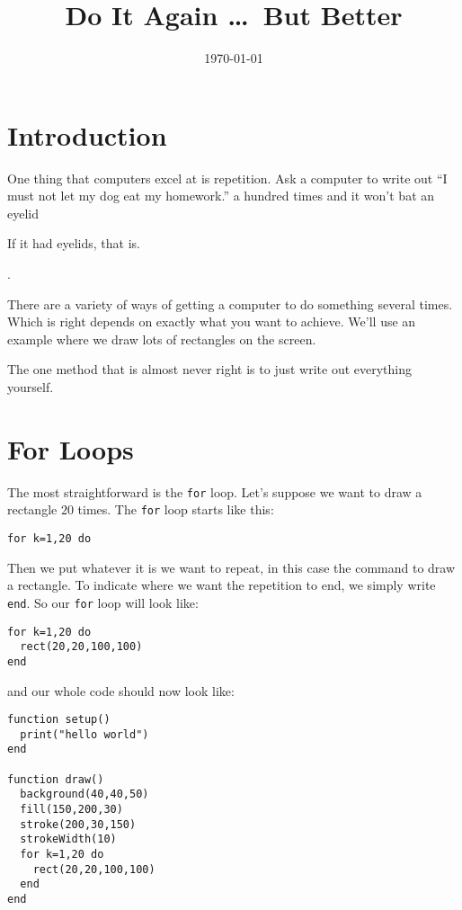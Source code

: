 \documentclass[
  xhtml,%
  use filename%
]{internet}
\title{Do It Again \dots\ But Better}
\date{\today}
\begin{document}
\maketitle

\section{Introduction}

One thing that computers excel at is repetition.
Ask a computer to write out ``I must not let my dog eat my homework.'' a hundred times and it won't bat an eyelid\begin{marginpar}If it had eyelids, that is.\end{marginpar}.

There are a variety of ways of getting a computer to do something several times.
Which is right depends on exactly what you want to achieve.
We'll use an example where we draw lots of rectangles on the screen.

The one method that is almost never right is to just write out everything yourself.

\section{For Loops}

The most straightforward is the \verb+for+ loop.
Let's suppose we want to draw a rectangle \(20\) times.
The \verb+for+ loop starts like this:

\begin{verbatim}
for k=1,20 do
\end{verbatim}

\noindent Then we put whatever it is we want to repeat, in this case the command to draw a rectangle.
To indicate where we want the repetition to end, we simply write \verb+end+.
So our \verb+for+ loop will look like:

\begin{verbatim}
for k=1,20 do
  rect(20,20,100,100)
end
\end{verbatim}

\noindent and our whole code should now look like:

\begin{verbatim}
function setup()
  print("hello world")
end

function draw()
  background(40,40,50)
  fill(150,200,30)
  stroke(200,30,150)
  strokeWidth(10)
  for k=1,20 do
    rect(20,20,100,100)
  end
end
\end{verbatim}
\end{document}
